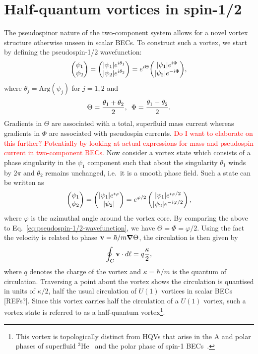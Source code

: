 \section{Half-quantum vortices in spin-1/2}\label{sec:half-quantum-vortices-in-spin-1/2}
The pseudospinor nature of the two-component system allows for a novel vortex
structure otherwise unseen in scalar BECs.
To construct such a vortex, we start by defining the pseudospin-1/2
wavefunction:
\begin{equation}
    \mqty(\psi_1 \\ \psi_2) = 
    \mqty(|\psi_1|e^{i\theta_1} \\ |\psi_2|e^{i\theta_2}) = 
    e^{i\Theta}\mqty(|\psi_1|e^{i\Phi} \\ |\psi_2|e^{-i\Phi}),
    \label{eq:pseudospin-1/2-wavefunction}  
\end{equation}
where $\theta_j=\mathrm{Arg}(\psi_j)$ for $j=1,2$ and
\begin{equation}
    \Theta = \frac{\theta_1 + \theta_2}{2}, \enskip 
    \Phi = \frac{\theta_1 - \theta_2}{2}.
    \label{eq:Theta-Phi}
\end{equation}
Gradients in $\Theta$ are associated with a total, superfluid mass current
whereas gradients in $\Phi$ are associated with pseudospin currents.
\textcolor{red}{Do I want to elaborate on this further? Potentially by looking
at actual expressions for mass and pseudospin current in two-component BECs.}
Now consider a vortex state which consists of a phase singularity in the
$\psi_1$ component such that about the singularity $\theta_1$ winds by $2\pi$
and $\theta_2$ remains unchanged, i.e.\ it is a smooth phase field.
Such a state can be written as
\begin{equation}
    \begin{pmatrix}\psi_1\\\psi_2\end{pmatrix} 
    = \begin{pmatrix}|\psi_1|e^{i\varphi}\\|\psi_2|\end{pmatrix}
    = e^{\varphi/2}\begin{pmatrix}|\psi_1|e^{i\varphi/2}\\|\psi_2|e^{-i\varphi/2}\end{pmatrix},
\end{equation}
where $\varphi$ is the azimuthal angle around the vortex core.
By comparing the above to Eq.~\eqref{eq:pseudospin-1/2-wavefunction}, we have
$\Theta=\Phi=\varphi/2$.
Using the fact the velocity is related to phase $\vb{v}=\hbar/m\grad\Theta$,
the circulation is then given by
\begin{equation}
    \oint_C\vb{v}\cdot d\vb{\ell} = q\frac{\kappa}{2},
\end{equation}
where $q$ denotes the charge of the vortex and $\kappa=\hbar/m$ is the quantum
of circulation.
Traversing a point about the vortex shows the circulation is quantised in units
of $\kappa/2$, half the usual circulation of $U(1)$ vortices in scalar BECs [REFs?].
Since this vortex carries half the circulation of a $U(1)$ vortex, such a vortex
state is referred to as a half-quantum vortex\footnote{This vortex is 
topologically distinct from HQVs that arise in the A and polar phases of
superfluid $^3$He~\cite{Autti2016} and the polar phase of spin-1
BECs~\cite{Leonhardt2000, Seo2015}.}.

